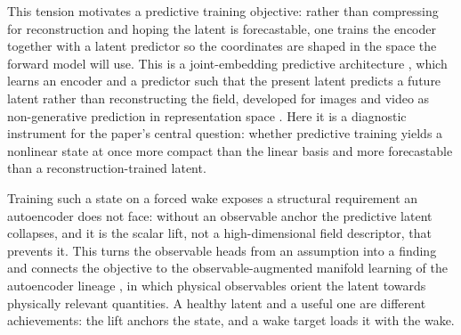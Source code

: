 This tension motivates a predictive training objective: rather than compressing for reconstruction and hoping the latent is forecastable, one trains the encoder together with a latent predictor so the coordinates are shaped in the space the forward model will use. This is a joint-embedding predictive architecture \citep{lecun2022}, which learns an encoder and a predictor such that the present latent predicts a future latent rather than reconstructing the field, developed for images and video as non-generative prediction in representation space \citep{ijepa,vjepa2}. Here it is a diagnostic instrument for the paper's central question: whether predictive training yields a nonlinear state at once more compact than the linear basis and more forecastable than a reconstruction-trained latent.\re

Training such a state on a forced wake exposes a structural requirement an autoencoder does not face: without an observable anchor the predictive latent collapses, and it is the scalar lift, not a high-dimensional field descriptor, that prevents it. This turns the observable heads from an assumption into a finding and connects the objective to the observable-augmented manifold learning of the autoencoder lineage \citep{fukami2023,fukami2025}, in which physical observables orient the latent towards physically relevant quantities. A healthy latent and a useful one are different achievements: the lift anchors the state, and a wake target loads it with the wake.\re


